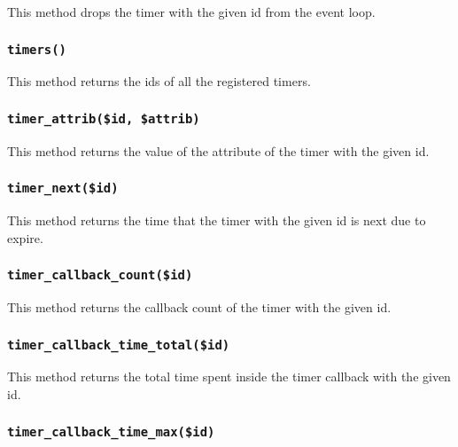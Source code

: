 \documentclass[12pt,a4paper]{article}
\begin{document}
This method drops the timer with the given id from the event loop.

\subsubsection*{\texttt{timers()}\label{xPL::Listener_timers_}}


This method returns the ids of all the registered timers.

\subsubsection*{\texttt{timer\_attrib(\$id, \$attrib)}\label{xPL::Listener_timer_attrib_id_attrib_}}


This method returns the value of the attribute of the timer with the
given id.

\subsubsection*{\texttt{timer\_next(\$id)}\label{xPL::Listener_timer_next_id_}}


This method returns the time that the timer with the given id is next
due to expire.

\subsubsection*{\texttt{timer\_callback\_count(\$id)}\label{xPL::Listener_timer_callback_count_id_}}


This method returns the callback count of the timer with the given id.

\subsubsection*{\texttt{timer\_callback\_time\_total(\$id)}\label{xPL::Listener_timer_callback_time_total_id_}}


This method returns the total time spent inside the timer callback with
the given id.

\subsubsection*{\texttt{timer\_callback\_time\_max(\$id)}\label{xPL::Listener_timer_callback_time_max_id_}}
\end{document}
